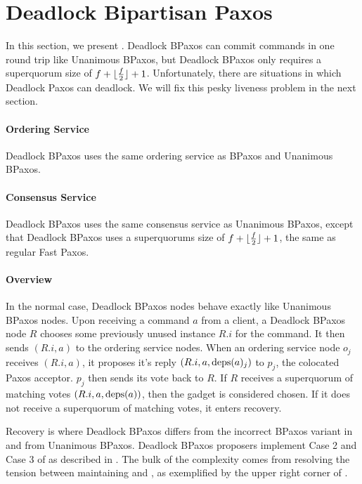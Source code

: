 \section{Deadlock Bipartisan Paxos}
In this section, we present . Deadlock
BPaxos can commit commands in one round trip like Unanimous BPaxos, but
Deadlock BPaxos only requires a superquorum size of $f + \lfloor\frac{f}{2}\rfloor +
1$. Unfortunately, there are situations in which Deadlock Paxos can deadlock.
We will fix this pesky liveness problem in the next section.

\paragraph{Ordering Service}
Deadlock BPaxos uses the same ordering service as BPaxos and Unanimous BPaxos.

\paragraph{Consensus Service}
Deadlock BPaxos uses the same consensus service as Unanimous BPaxos, except
that Deadlock BPaxos uses a superquorums size of $f + \lfloor\frac{f}{2}\rfloor + 1$,
the same as regular Fast Paxos.

\paragraph{Overview}
In the normal case, Deadlock BPaxos nodes behave exactly like Unanimous BPaxos
nodes. Upon receiving a command $a$ from a client, a Deadlock BPaxos node $R$
chooses some previously unused instance $R.i$ for the command. It then sends
$(R.i, a)$ to the ordering service nodes.
%
When an ordering service node $o_j$ receives $(R.i, a)$, it proposes it's reply
$(R.i, a, \text{deps}(a)_j)$ to $p_j$, the colocated Paxos acceptor. $p_j$ then sends
its vote back to $R$.
%
If $R$ receives a superquorum of matching votes $(R.i, a, \text{deps}(a))$, then the
gadget is considered chosen. If it does not receive a superquorum of matching
votes, it enters recovery.

Recovery is where Deadlock BPaxos differs from the incorrect BPaxos variant in
 and from Unanimous BPaxos. Deadlock BPaxos proposers
implement Case 2 and Case 3 of  as described in
. The bulk of the complexity comes from resolving the
tension between maintaining  and
, as exemplified by the upper right corner of
.

